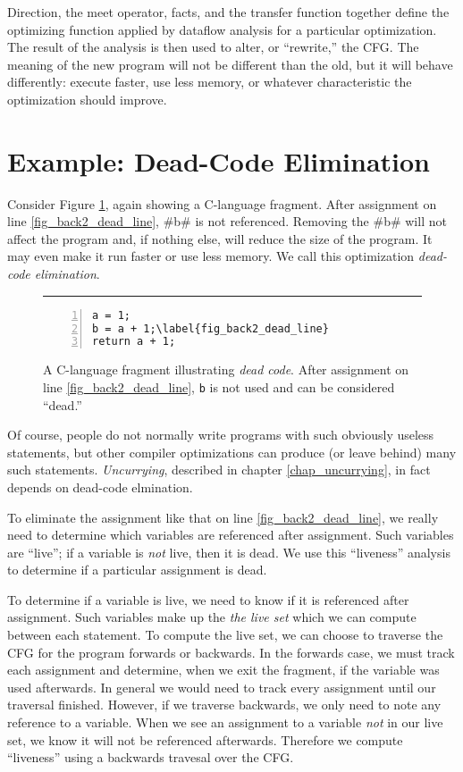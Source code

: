 \documentclass[12pt]{report}
\begin{document}
Direction, the meet operator, facts, and the transfer function
together define the optimizing function applied by dataflow analysis
for a particular optimization. The result of the analysis is then used
to alter, or ``rewrite,'' the CFG. The meaning of the new program will
not be different than the old, but it will behave differently: execute
faster, use less memory, or whatever characteristic the optimization
should improve.

\section{Example: Dead-Code Elimination}

Consider Figure \ref{fig_back2}, again showing a C-language fragment.
After assignment on line \ref{fig_back2_dead_line}, #b# is not
referenced. Removing the #b# will not affect the program and,
if nothing else, will reduce the size of the program. It may even make
it run faster or use less memory. We call this optimization
\emph{dead-code elimination}. 

\begin{figure}[ht]\centering
\rule{\linewidth-}{0.4pt}
\begin{Verbatim}[numbers=left,commandchars=\\\{\}]
a = 1; 
b = a + 1;\label{fig_back2_dead_line}
return a + 1;
\end{Verbatim}
\caption{A C-language fragment illustrating \emph{dead code}. After 
assignment on line \ref{fig_back2_dead_line}, \verb=b= is not used
and can be considered ``dead.''}
\label{fig_back2}
\end{figure}

Of course, people do not normally write programs with such obviously
useless statements, but other compiler optimizations can produce (or
leave behind) many such statements. \emph{Uncurrying}, described in
chapter \ref{chap_uncurrying}, in fact depends on dead-code elmination. 

To eliminate the assignment like that on line
\ref{fig_back2_dead_line}, we really need to determine which variables
are referenced after assignment. Such variables are ``live''; if a
variable is \emph{not} live, then it is dead. We use this ``liveness''
analysis to determine if a particular assignment is dead.

To determine if a variable is live, we need to know if it is
referenced after assignment.  Such variables make up the \emph{the
  live set} which we can compute between each statement. To compute
the live set, we can choose to traverse the CFG for the program forwards or
backwards.  In the forwards case, we must track each assignment and
determine, when we exit the fragment, if the variable was used
afterwards. In general we would need to track every assignment until
our traversal finished. However, if we traverse backwards, we only
need to note any reference to a variable. When we see an assignment to
a variable \emph{not} in our live set, we know it will not be
referenced afterwards. Therefore we compute ``liveness'' using a
backwards travesal over the CFG.
 
\end{document}
